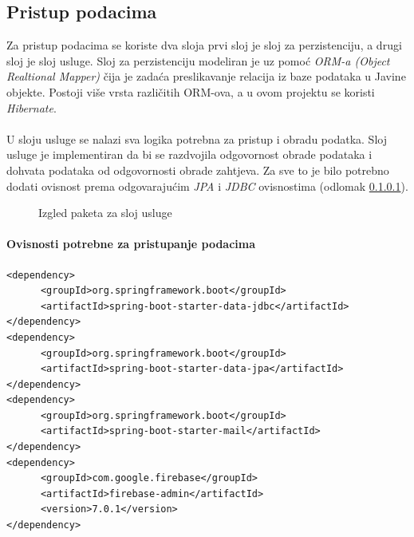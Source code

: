 \documentclass[times, utf8, zavrsni]{fer}
\begin{document}
\subsection{Pristup podacima}
Za pristup podacima se koriste dva sloja prvi sloj je sloj za perzistenciju, a drugi sloj je sloj usluge. Sloj za perzistenciju
modeliran je uz pomoć \textit{ORM-a (Object Realtional Mapper)} čija je zadaća preslikavanje relacija
iz baze podataka u Javine objekte. Postoji više vrsta različitih ORM-ova, a u ovom projektu se koristi \textit{Hibernate}.
\\\\
U sloju usluge se nalazi sva logika potrebna za pristup i obradu podatka.
Sloj usluge je implementiran da bi se razdvojila odgovornost obrade podataka i dohvata podataka od odgovornosti obrade zahtjeva.
Za sve to je bilo potrebno dodati ovisnost prema odgovarajućim
\textit{JPA} i \textit{JDBC} ovisnostima (odlomak \ref{dataAccess}).
\begin{figure}[h]
      \centering
      \caption{Izgled paketa za sloj usluge}
      \label{fig:services}
\end{figure}
\paragraph{Ovisnosti potrebne za pristupanje podacima}
\label{dataAccess}
\begin{Verbatim}[fontsize=\scriptsize]
<dependency>
      <groupId>org.springframework.boot</groupId>
      <artifactId>spring-boot-starter-data-jdbc</artifactId>
</dependency>
<dependency>
      <groupId>org.springframework.boot</groupId>
      <artifactId>spring-boot-starter-data-jpa</artifactId>
</dependency>
<dependency>
      <groupId>org.springframework.boot</groupId>
      <artifactId>spring-boot-starter-mail</artifactId>
</dependency>
<dependency>
      <groupId>com.google.firebase</groupId>
      <artifactId>firebase-admin</artifactId>
      <version>7.0.1</version>
</dependency>
\end{Verbatim}
\end{document}
